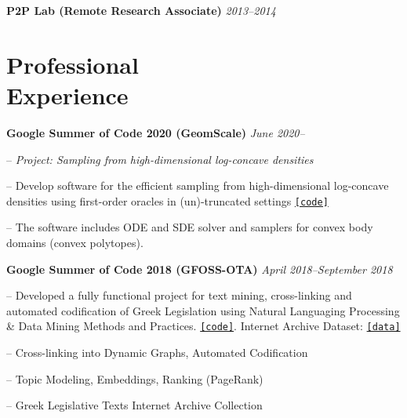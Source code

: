 \documentclass[margin, 10pt]{res}
\newcommand{\field}[2]{\noindent \textbf{#1} \hfill #2 \\}
\newcommand{\specialurl}[2]{\href { #2 } {\nolinkurl{[#1]}}}
\newcommand{\code}[1]{\specialurl {code} {#1}}
\newcommand{\data}[1]{\specialurl {data} {#1}}
\begin{document}
\begin{resume}
\textbf{P2P Lab (Remote Research Associate)} \hfill \emph{2013--2014}


 
\section{Professional \\ Experience}
\field{Google Summer of Code 2020 (GeomScale)}  {\emph{June 2020--}}
\begin{compactitem}
\item[--] \emph{Project: Sampling from high-dimensional log-concave densities} 
\item[--] Develop software for the efficient sampling from high-dimensional log-concave densities using first-order oracles in (un)-truncated settings \code{https://GeomScale/volume_approximation}
\item[--] The software includes ODE and SDE solver and samplers for convex body domains (convex polytopes).
\end{compactitem}

\field{Google Summer of Code 2018 (GFOSS-OTA)}  {\emph{April 2018--September 2018}}
\begin{compactitem}
\item[--] Developed a fully functional project for text mining, cross-linking and automated codification of Greek Legislation using Natural Languaging Processing \& Data Mining Methods and Practices.  \code{https://github.com/eellak/gsoc2018-3gm}. Internet Archive Dataset: \data{https://archive.org/details/greekgovernmentgazette} 

\begin{compactitem}
\item[--] Cross-linking into Dynamic Graphs, Automated Codification
\item[--] Topic Modeling, Embeddings, Ranking (PageRank)
\item[--] Greek Legislative Texts Internet Archive Collection 
\end{compactitem}
\end{compactitem}


\end{resume}
\end{document}
